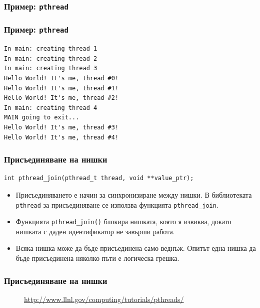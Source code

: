 \documentclass[ignorenonframetext, hyperref=unicode]{beamer}
\begin{document}
\begin{frame}[containsverbatim]
\frametitle{Пример: \lstinline{pthread}}

\end{frame}

\begin{frame}[containsverbatim]
\frametitle{Пример: \lstinline{pthread}}
\begin{verbatim}
In main: creating thread 1
In main: creating thread 2
In main: creating thread 3
Hello World! It's me, thread #0!
Hello World! It's me, thread #1!
Hello World! It's me, thread #2!
In main: creating thread 4
MAIN going to exit...
Hello World! It's me, thread #3!
Hello World! It's me, thread #4!
\end{verbatim}
\end{frame}

\begin{frame}[containsverbatim]
\frametitle{Присъединяване на нишки}
\begin{lstlisting}[numbers=none]
int pthread_join(pthread_t thread, void **value_ptr);
\end{lstlisting}
\begin{itemize}
\item Присъединяването  е начин за синхронизиране между нишки. В библиотеката
\lstinline{pthread} за присъединяване се използва функцията
\lstinline{pthread_join}. 
\item Функцията \lstinline{pthread_join()} блокира нишката, която я извиква,
докато нишката с даден идентификатор не завърши работа.
\item Всяка нишка може да бъде присъединена само веднъж. Опитът една нишка да
бъде присъединена няколко пъти е логическа грешка.
\end{itemize}
\end{frame}

\begin{frame}[containsverbatim]
\frametitle{Присъединяване на нишки}
\begin{figure}[h]
\center
{}
\caption{\url{http://www.llnl.gov/computing/tutorials/pthreads/}}
\end{figure}
\end{frame}
\end{document}

